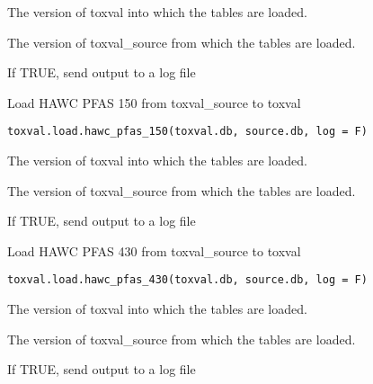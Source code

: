 \documentclass[letterpaper]{book}
\begin{document}
%
\begin{Arguments}
\begin{ldescription}
\item[\code{toxval.db}] The version of toxval into which the tables are loaded.

\item[\code{source.db}] The version of toxval\_source from which the tables are loaded.

\item[\code{log}] If TRUE, send output to a log file
\end{ldescription}
\end{Arguments}
%
\begin{Description}\relax
Load HAWC PFAS 150 from toxval\_source to toxval
\end{Description}
%
\begin{Usage}
\begin{verbatim}
toxval.load.hawc_pfas_150(toxval.db, source.db, log = F)
\end{verbatim}
\end{Usage}
%
\begin{Arguments}
\begin{ldescription}
\item[\code{toxval.db}] The version of toxval into which the tables are loaded.

\item[\code{source.db}] The version of toxval\_source from which the tables are loaded.

\item[\code{log}] If TRUE, send output to a log file
\end{ldescription}
\end{Arguments}
%
\begin{Description}\relax
Load HAWC PFAS 430 from toxval\_source to toxval
\end{Description}
%
\begin{Usage}
\begin{verbatim}
toxval.load.hawc_pfas_430(toxval.db, source.db, log = F)
\end{verbatim}
\end{Usage}
%
\begin{Arguments}
\begin{ldescription}
\item[\code{toxval.db}] The version of toxval into which the tables are loaded.

\item[\code{source.db}] The version of toxval\_source from which the tables are loaded.

\item[\code{log}] If TRUE, send output to a log file
\end{ldescription}
\end{Arguments}
\end{document}
